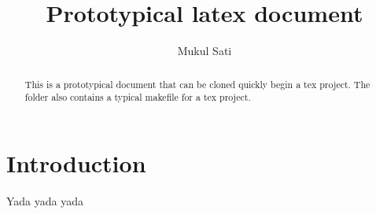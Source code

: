 \documentclass{article}
\title{Prototypical latex document}
\author{Mukul Sati}
\begin{document}
\begin{abstract}
This is a prototypical document that can be cloned quickly begin a tex project.
The folder also contains a typical makefile for a tex project.
\end{abstract}

\section{Introduction}
Yada yada yada


\end{document}
